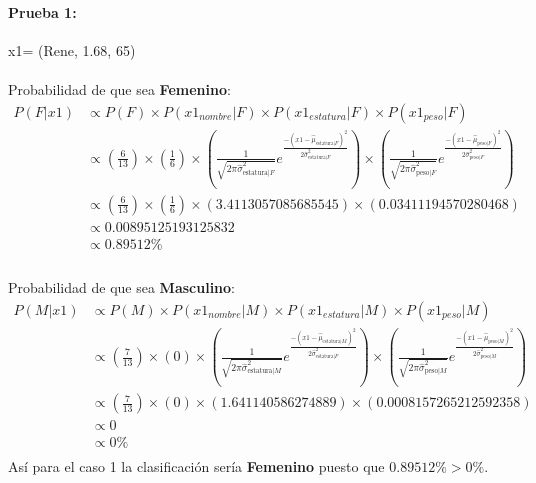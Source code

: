 \documentclass[12pt]{article}
\begin{document}
 \paragraph{Prueba 1: }x1= (Rene, 1.68, 65)
 \paragraph{}Probabilidad de que sea \textbf{Femenino}:\\
 \begin{equation}
 \begin{split}
 P(F|x1) &\propto P(F) \times P(x1_{nombre}|F) \times P(x1_{estatura}|F) \times P(x1_{peso}|F) \\
 &\propto (\frac{6}{13}) \times (\frac{1}{6}) \times (\frac{1}{\sqrt{2\pi\hat{\sigma}_{\text{estatura}|F}^2}}e^{\frac{-(x1 - \hat{\mu}_{\text{estatura}|F})^2}{2\hat{\sigma}_{\text{estatura}|F}^2}}) \times (\frac{1}{\sqrt{2\pi\hat{\sigma}_{\text{peso}|F}^2}}e^{\frac{-(x1 - \hat{\mu}_{\text{peso}|F})^2}{2\hat{\sigma}_{\text{peso}|F}^2}}) \\
 &\propto (\frac{6}{13}) \times (\frac{1}{6}) \times (3.4113057085685545) \times (0.03411194570280468) \\
 &\propto 0.00895125193125832 \\
 &\propto 0.89512\% \\
 \end{split}
 \end{equation}
 \paragraph{}Probabilidad de que sea \textbf{Masculino}:\\
 \begin{equation}
 \begin{split}
 P(M|x1) &\propto P(M) \times P(x1_{nombre}|M) \times P(x1_{estatura}|M) \times P(x1_{peso}|M) \\
 &\propto (\frac{7}{13}) \times (0) \times (\frac{1}{\sqrt{2\pi\hat{\sigma}_{\text{estatura}|M}^2}}e^{\frac{-(x1 - \hat{\mu}_{\text{estatura}|M})^2}{2\hat{\sigma}_{\text{estatura}|F}^2}}) \times (\frac{1}{\sqrt{2\pi\hat{\sigma}_{\text{peso}|M}^2}}e^{\frac{-(x1 - \hat{\mu}_{\text{peso}|M})^2}{2\hat{\sigma}_{\text{peso}|M}^2}}) \\
 &\propto (\frac{7}{13}) \times (0) \times (1.641140586274889) \times (0.0008157265212592358) \\
 &\propto 0 \\
 &\propto 0 \% \\
 \end{split}
 \end{equation}
 Así para el caso 1 la clasificación sería \textbf{Femenino} puesto que $0.89512\% > 0\%$.\\
 \clearpage
 \pagebreak
\end{document}
